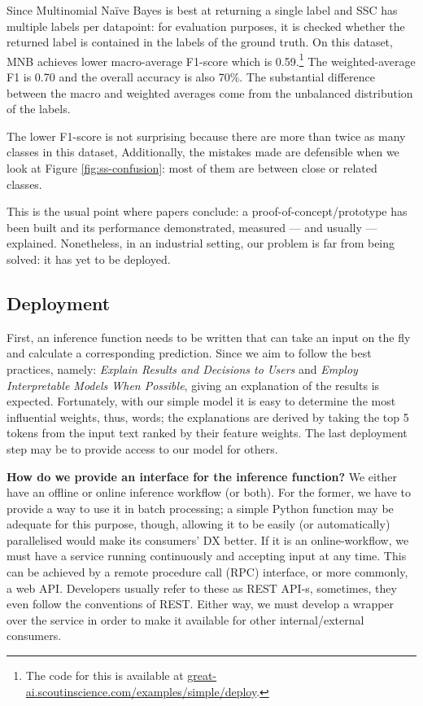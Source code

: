 Since Multinomial Naïve Bayes is best at returning a single label and SSC has multiple labels per datapoint: for evaluation purposes, it is checked whether the returned label is contained in the labels of the ground truth. On this dataset, MNB achieves lower macro-average F1-score which is 0.59.\footnote{The code for this is available at \href{https://great-ai.scoutinscience.com/examples/simple/deploy}{great-ai.scoutinscience.com/examples/simple/deploy}.} The weighted-average F1 is 0.70 and the overall accuracy is also 70\%. The substantial difference between the macro and weighted averages come from the unbalanced distribution of the labels.

The lower F1-score is not surprising because there are more than twice as many classes in this dataset,  Additionally, the mistakes made are defensible when we look at Figure \ref{fig:ss-confusion}: most of them are between close or related classes.

\begin{displayquote}
This is the usual point where papers conclude: a proof-of-concept/prototype has been built and its performance demonstrated, measured --- and usually --- explained. Nonetheless, in an industrial setting, our problem is far from being solved: it has yet to be deployed.
\end{displayquote}

\subsection{Deployment}

First, an inference function needs to be written that can take an input on the fly and calculate a corresponding prediction. Since we aim to follow the best practices, namely: \textit{Explain Results and Decisions to Users} and \textit{Employ Interpretable Models When Possible}, giving an explanation of the results is expected. Fortunately, with our simple model it is easy to determine the most influential weights, thus, words; the explanations are derived by taking the top 5 tokens from the input text ranked by their feature weights. The last deployment step may be to provide access to our model for others.

\begin{displayquote}
\textbf{How do we provide an interface for the inference function?} We either have an offline or online inference workflow (or both). For the former, we have to provide a way to use it in batch processing; a simple Python function may be adequate for this purpose, though, allowing it to be easily (or automatically) parallelised would make its consumers' DX better. If it is an online-workflow, we must have a service running continuously and accepting input at any time. This can be achieved by a remote procedure call (RPC) interface, or more commonly, a web API. Developers usually refer to these as REST API-s, sometimes, they even follow the conventions of REST. Either way, we must develop a wrapper over the service in order to make it available for other internal/external consumers.
\end{displayquote}

